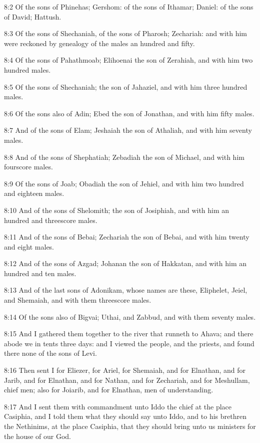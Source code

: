 8:2 Of the sons of Phinehas; Gershom: of the sons of Ithamar; Daniel: of the sons of David; Hattush.

8:3 Of the sons of Shechaniah, of the sons of Pharosh; Zechariah: and with him were reckoned by genealogy of the males an hundred and fifty.

8:4 Of the sons of Pahathmoab; Elihoenai the son of Zerahiah, and with him two hundred males.

8:5 Of the sons of Shechaniah; the son of Jahaziel, and with him three hundred males.

8:6 Of the sons also of Adin; Ebed the son of Jonathan, and with him fifty males.

8:7 And of the sons of Elam; Jeshaiah the son of Athaliah, and with him seventy males.

8:8 And of the sons of Shephatiah; Zebadiah the son of Michael, and with him fourscore males.

8:9 Of the sons of Joab; Obadiah the son of Jehiel, and with him two hundred and eighteen males.

8:10 And of the sons of Shelomith; the son of Josiphiah, and with him an hundred and threescore males.

8:11 And of the sons of Bebai; Zechariah the son of Bebai, and with him twenty and eight males.

8:12 And of the sons of Azgad; Johanan the son of Hakkatan, and with him an hundred and ten males.

8:13 And of the last sons of Adonikam, whose names are these, Eliphelet, Jeiel, and Shemaiah, and with them threescore males.

8:14 Of the sons also of Bigvai; Uthai, and Zabbud, and with them seventy males.

8:15 And I gathered them together to the river that runneth to Ahava; and there abode we in tents three days: and I viewed the people, and the priests, and found there none of the sons of Levi.

8:16 Then sent I for Eliezer, for Ariel, for Shemaiah, and for Elnathan, and for Jarib, and for Elnathan, and for Nathan, and for Zechariah, and for Meshullam, chief men; also for Joiarib, and for Elnathan, men of understanding.

8:17 And I sent them with commandment unto Iddo the chief at the place Casiphia, and I told them what they should say unto Iddo, and to his brethren the Nethinims, at the place Casiphia, that they should bring unto us ministers for the house of our God.

